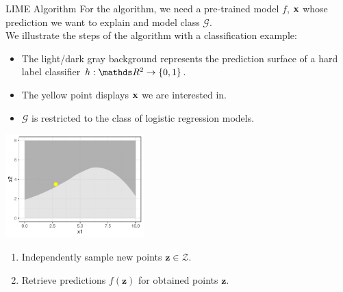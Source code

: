 \documentclass[11pt,compress,t,notes=noshow, xcolor=table]{beamer}
\newcommand{\Gspace}{\mathcal{G}}
\newcommand{\zv}{\mathbf{z}}
\newcommand{\Zspace}{\mathcal{Z}}
\begin{document}
\begin{vbframe}{LIME Algorithm}
		For the algorithm, we need a pre-trained model $f$, $\xv$ whose prediction we want to explain and model class $\Gspace$.\\ \vspace{0.5cm}
		We illustrate the steps of the algorithm with a classification example: 
		\begin{itemize}
			\item The light/dark gray background represents the prediction surface of a hard label classifier $h: \R^2 \to \{0, 1\}$.
			\item The yellow point displays $\xv$ we are interested in. 
			\item $\Gspace$ is restricted to the class of logistic regression models. 
		\end{itemize}
		\begin{center}
			\includegraphics[width=0.4\textwidth]{figure/lime2}
		\end{center}
	
		\begin{enumerate}
		\framebreak 
		\item Independently sample new points $\zv \in \Zspace$. 
		\item Retrieve predictions $f(\zv)$ for obtained points $\zv$. \\[0.2cm]
		

\end{enumerate}
\end{vbframe}
\end{document}

